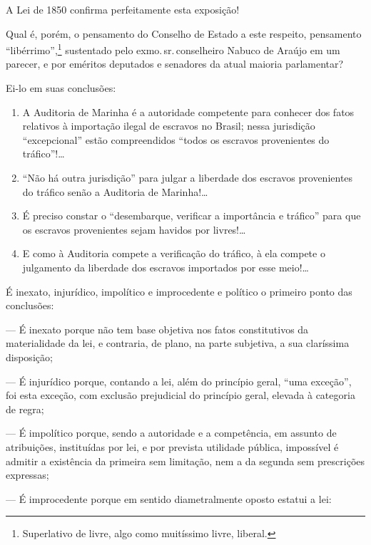 A Lei de 1850 confirma perfeitamente esta exposição!

\asterisc

Qual é, porém, o pensamento do Conselho de Estado a este respeito,
pensamento ``libérrimo'',\footnote{Superlativo de livre,
  algo como muitíssimo livre, liberal.} sustentado pelo exmo.\,sr.\,conselheiro Nabuco de Araújo em um parecer, e por eméritos deputados e
senadores da atual maioria parlamentar?

Ei-lo em suas conclusões:

\begin{enumerate}[label=\arabic*º]
\item A Auditoria de Marinha é a autoridade competente para conhecer dos
fatos relativos à importação ilegal de escravos no Brasil; nessa
jurisdição ``excepcional'' estão compreendidos ``todos os escravos
provenientes do tráfico''!\ldots{}

\item ``Não há outra jurisdição'' para julgar a liberdade dos escravos
provenientes do tráfico senão a Auditoria de Marinha!\ldots{}

\item É preciso constar o ``desembarque, verificar a importância e tráfico''
para que os escravos provenientes sejam havidos por livres!\ldots{}

\item E como à Auditoria compete a verificação do tráfico, à ela compete o
julgamento da liberdade dos escravos importados por esse meio!\ldots{}
\end{enumerate}

É inexato, injurídico, impolítico e improcedente e político o primeiro
ponto das conclusões:

--- É inexato porque não tem base objetiva nos fatos constitutivos da
materialidade da lei, e contraria, de plano, na parte subjetiva, a sua
claríssima disposição;

--- É injurídico porque, contando a lei, além do princípio geral, ``uma
exceção'', foi esta exceção, com exclusão prejudicial do princípio geral,
elevada à categoria de regra;

--- É impolítico porque, sendo a autoridade e a competência, em assunto
de atribuições, instituídas por lei, e por prevista utilidade pública,
impossível é admitir a existência da primeira sem limitação, nem a da
segunda sem prescrições expressas;

--- É improcedente porque em sentido diametralmente oposto estatui a
lei:

